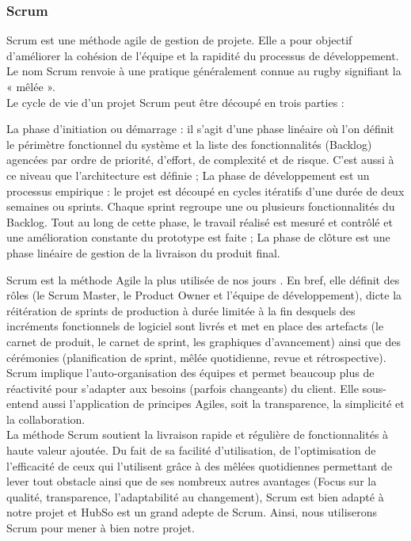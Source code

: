 \subsubsection{Scrum}
Scrum est une méthode agile de gestion de projete. Elle a pour objectif d’améliorer la cohésion de
l’équipe et la rapidité du processus de développement. Le nom Scrum renvoie à une pratique généralement connue au rugby signifiant la « mêlée ».\\
Le cycle de vie d’un projet Scrum peut être découpé en trois parties :
\begin{itemize}
	\itemcheck La phase d’initiation ou démarrage : il s’agit d’une phase linéaire où l’on
	définit le périmètre fonctionnel du système et la liste des fonctionnalités
	(Backlog) agencées par ordre de priorité, d’effort, de complexité et de risque.
	C’est aussi à ce niveau que l’architecture est définie ;
	\itemcheck La phase de développement est un processus empirique : le projet est découpé
	en cycles itératifs d’une durée de deux semaines ou sprints. Chaque sprint
	regroupe une ou plusieurs fonctionnalités du Backlog. Tout au long de cette
	phase, le travail réalisé est mesuré et contrôlé et une amélioration constante du
	prototype est faite ;
	\itemcheck La phase de clôture est une phase linéaire de gestion de la livraison du produit
	final.
\end{itemize}
Scrum est la méthode Agile la plus utilisée de nos jours \cite{scrum}. En bref, elle définit des rôles (le Scrum Master, le Product Owner et l’équipe de développement), dicte la réitération de sprints de production à durée limitée à la fin desquels des incréments fonctionnels de logiciel sont livrés et met en place des artefacts (le carnet de produit, le carnet de sprint, les graphiques d’avancement) ainsi que des cérémonies (planification de sprint, mêlée quotidienne, revue et rétrospective).
Scrum implique l’auto-organisation des équipes et permet beaucoup plus de réactivité pour s’adapter aux besoins (parfois changeants) du client. Elle sous-entend aussi l’application de principes Agiles, soit la transparence, la simplicité et la collaboration.\\
La méthode Scrum soutient la livraison rapide et régulière de fonctionnalités à haute valeur ajoutée.
Du fait de sa facilité d'utilisation, de l'optimisation de l'efficacité de ceux qui l'utilisent grâce à des mêlées quotidiennes permettant de lever tout obstacle ainsi que de ses nombreux autres avantages (Focus sur la qualité, transparence, l'adaptabilité au changement), Scrum est bien adapté à notre projet et HubSo est un grand adepte de Scrum. Ainsi, nous utiliserons Scrum pour mener à bien notre projet.
